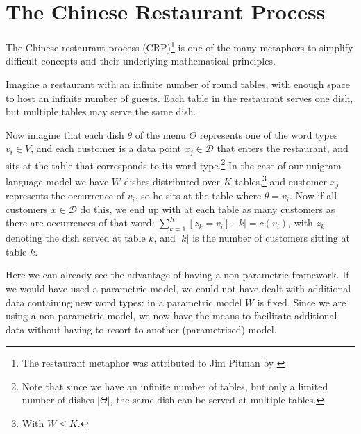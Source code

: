 \section{The Chinese Restaurant Process}
The Chinese restaurant process (CRP)\footnote{The restaurant metaphor was attributed to Jim Pitman by \citep{Aldous1985Exchangeability}} is one of the many metaphors to simplify difficult concepts and their underlying mathematical principles. 

Imagine a restaurant with an infinite number of round tables, with enough space to host an infinite number of guests. Each table in the restaurant serves one dish, but multiple tables may serve the same dish.

Now imagine that each dish $\theta$ of the menu $\Theta$ represents one of the word types $v_i \in V$, and each customer is a data point $x_j\in\mathcal{D}$ that enters the restaurant, and sits at the table that corresponds to its word type.\footnote{Note that since we have an infinite number of tables, but only a limited number of dishes $|\Theta|$, the same dish can be served at multiple tables.} In the case of our unigram language model we have $W$ dishes distributed over $K$ tables,\footnote{With $W\leq K$.} and customer $x_j$ represents the occurrence of $v_i$, so he sits at the table where $\theta = 
v_i$. Now if all customers $x\in\mathcal{D}$ do this, we end up with at each table as many customers as there are occurrences of that word: $\sum_{k=1}^K[z_k=v_i]\cdot|k| = c(v_i)$, with $z_k$ denoting the dish served at table $k$, and $|k|$ is the number of customers sitting at table $k$.

Here we can already see the advantage of having a non-parametric framework. If we would have used a parametric model, we could not have dealt with additional data containing new word types: in a parametric model $W$ is fixed. Since we are using a non-parametric model, we now have the means to facilitate additional data without having to resort to another (parametrised) model.

